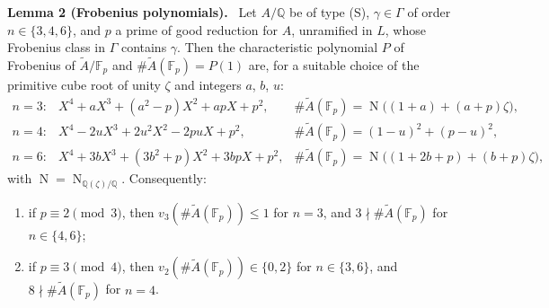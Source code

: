 \documentclass[11pt]{article}
\newenvironment{statement}[1]{\par\medskip\noindent\phantomsection\textbf{#1}\ }{\par\medskip}
\newcommand{\Q}{\mathbb Q}
\newcommand{\F}{\mathbb F}
\DeclareMathOperator{\Norm}{N}
\begin{document}
\begin{statement}{Lemma 2 (Frobenius polynomials).}\label{lemma-shapes}
Let \(A/\Q\) be of type (S), \(\gamma\in\Gamma\) of order \(n\in\{3,4,6\}\), and \(p\) a prime of good reduction
for \(A\), unramified in \(L\), whose Frobenius class in \(\Gamma\) contains \(\gamma\). Then the characteristic
polynomial \(P\) of Frobenius of \(\widetilde A/\F_p\) and \(\#\widetilde A(\F_p)=P(1)\) are, for a suitable choice
of the primitive cube root of unity \(\zeta\) and integers \(a\), \(b\), \(u\):
\[\begin{array}{lll}
n=3\colon & X^4+aX^3+(a^2-p)X^2+apX+p^2, & \#\widetilde A(\F_p)=\Norm\bigl((1+a)+(a+p)\zeta\bigr),\\[2pt]
n=4\colon & X^4-2uX^3+2u^2X^2-2puX+p^2, & \#\widetilde A(\F_p)=(1-u)^2+(p-u)^2,\\[2pt]
n=6\colon & X^4+3bX^3+(3b^2+p)X^2+3bpX+p^2, & \#\widetilde A(\F_p)=\Norm\bigl((1+2b+p)+(b+p)\zeta\bigr),
\end{array}\]
with \(\Norm=\Norm_{\Q(\zeta)/\Q}\). Consequently:
\begin{enumerate}
\item[(i)] if \(p\equiv2\pmod3\), then \(v_3(\#\widetilde A(\F_p))\le1\) for \(n=3\), and
\(3\nmid\#\widetilde A(\F_p)\) for \(n\in\{4,6\}\);
\item[(ii)] if \(p\equiv3\pmod4\), then \(v_2(\#\widetilde A(\F_p))\in\{0,2\}\) for \(n\in\{3,6\}\), and
\(8\nmid\#\widetilde A(\F_p)\) for \(n=4\).
\end{enumerate}
\end{statement}
\end{document}
